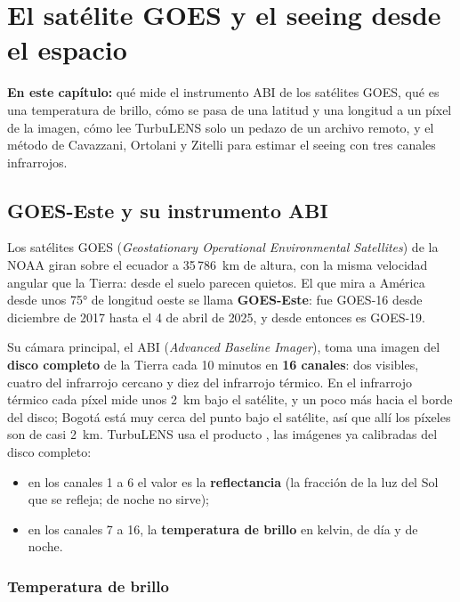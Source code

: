 \chapter{El satélite GOES y el seeing desde el espacio}\label{cap:satelite_teoria}

\begin{resumen}
\textbf{En este capítulo:} qué mide el instrumento ABI de los satélites GOES, qué es una temperatura de brillo, cómo se
pasa de una latitud y una longitud a un píxel de la imagen, cómo lee TurbuLENS solo un pedazo de un archivo remoto, y
el método de Cavazzani, Ortolani y Zitelli para estimar el seeing con tres canales infrarrojos.
\end{resumen}

\section{GOES-Este y su instrumento ABI}

Los satélites GOES (\emph{Geostationary Operational Environmental Satellites}) de la NOAA giran sobre el ecuador a
35\,786~km de altura, con la misma velocidad angular que la Tierra: desde el suelo parecen quietos. El que mira a América
desde unos 75° de longitud oeste se llama \textbf{GOES-Este}: fue GOES-16 desde diciembre de 2017 hasta el 4 de abril
de 2025, y desde entonces es GOES-19.

Su cámara principal, el ABI (\emph{Advanced Baseline Imager}), toma una imagen del \textbf{disco completo} de la Tierra cada
10 minutos en \textbf{16 canales}: dos visibles, cuatro del infrarrojo cercano y diez del infrarrojo térmico. En el
infrarrojo térmico cada píxel mide unos 2~km bajo el satélite, y un poco más hacia el borde del disco; Bogotá está muy
cerca del punto bajo el satélite, así que allí los píxeles son de casi 2~km. TurbuLENS
usa el producto , las imágenes ya calibradas del disco completo:
\begin{itemize}
\item en los canales 1 a 6 el valor es la \textbf{reflectancia} (la fracción de la luz del Sol que se refleja; de noche no
sirve);
\item en los canales 7 a 16, la \textbf{temperatura de brillo} en kelvin, de día y de noche.
\end{itemize}

\subsection{Temperatura de brillo}

